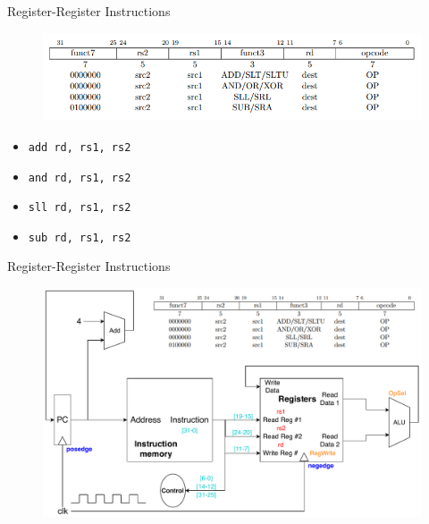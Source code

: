 \documentclass{myslide}
\begin{document}
\begin{frame}[fragile]{Register-Register Instructions}
\begin{figure}
\centering
\includegraphics[width=\linewidth]{fig/Lecture2/r-r.PNG}
\end{figure}
\begin{itemize}
	\item \verb'add rd, rs1, rs2'
	\item \verb'and rd, rs1, rs2'
	\item \verb'sll rd, rs1, rs2'
	\item \verb'sub rd, rs1, rs2'
\end{itemize}
\end{frame}

\begin{frame}{Register-Register Instructions}
\begin{figure}
\centering
\includegraphics[width=\linewidth]{fig/Lecture2/Datapath-R-R.pdf}
\end{figure}
\end{frame}
\end{document}
